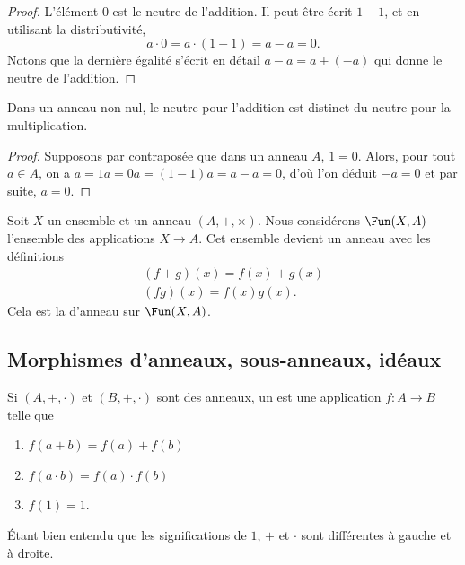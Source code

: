 \begin{proof}
    L'élément \( 0\) est le neutre de l'addition. Il peut être écrit \( 1-1\), et en utilisant la distributivité,
    \begin{equation}
        a\cdot 0=a\cdot (1-1)=a-a=0.
    \end{equation}
    Notons que la dernière égalité s'écrit en détail \( a-a=a+(-a)\) qui donne le neutre de l'addition.
\end{proof}

\begin{proposition}     \label{PROPooNCCGooXjVyVt}
    Dans un anneau non nul, le neutre pour l'addition est distinct du neutre pour la multiplication.
\end{proposition}
\begin{proof}
    Supposons par contraposée que dans un anneau $A$, \( 1 = 0 \). Alors, pour tout \( a \in A \), on a \( a = 1a = 0a = (1 - 1)a = a - a=0 \), d'où l'on déduit \( -a = 0  \) et par suite, \( a = 0. \)
\end{proof}

\begin{normaltext}
Soit \( X\) un ensemble et un anneau $(A, +, \times)$. Nous considérons \( \Fun(X,A)\) l'ensemble des applications \( X\to A\). Cet ensemble devient un anneau avec les définitions
\begin{subequations}
    \begin{align}
        (f+g)(x)=f(x)+g(x)\\
        (fg)(x)=f(x)g(x).
    \end{align}
\end{subequations}
Cela est la  d'anneau sur \( \Fun(X,A)\).
\end{normaltext}


\subsection{Morphismes d'anneaux, sous-anneaux, idéaux}

\begin{definition}      \label{DEFooSPHPooCwjzuz}
    Si \( (A,+,\cdot)\) et \( (B,+,\cdot)\) sont des anneaux, un  est une application \( f\colon A\to B\) telle que
    \begin{enumerate}
        \item \( f(a+b)=f(a)+f(b)\)
        \item
            \( f(a\cdot b)=f(a)\cdot f(b)\)
        \item
            \( f(1)=1\).
    \end{enumerate}
    Étant bien entendu que les significations de \( 1\), $+$ et \( \cdot\) sont différentes à gauche et à droite.
\end{definition}

